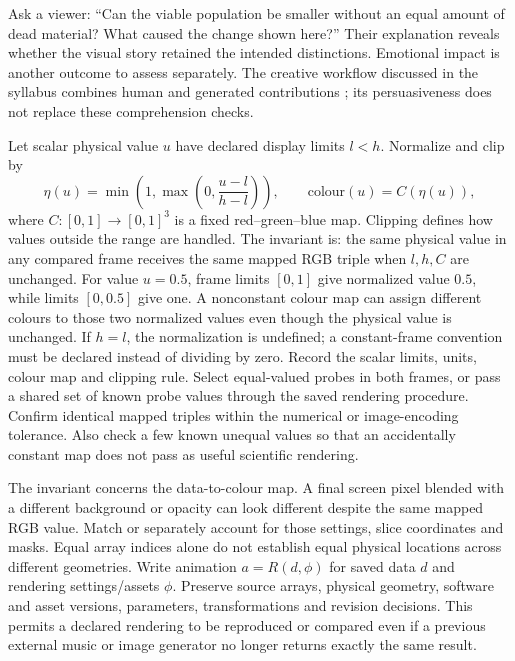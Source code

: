 Ask a viewer: ``Can the viable population be smaller without an equal amount of dead material? What caused the change shown here?'' Their explanation reveals whether the visual story retained the intended distinctions. Emotional impact is another outcome to assess separately. The creative workflow discussed in the syllabus combines human and generated contributions \citep{knudsen2026changed}; its persuasiveness does not replace these comprehension checks.

Let scalar physical value $u$ have declared display limits $l<h$. Normalize and clip by
\[
\eta(u)=\min\!\left(1,\max\!\left(0,\frac{u-l}{h-l}\right)\right),
\qquad \mathrm{colour}(u)=C(\eta(u)),
\]
where $C:[0,1]\to[0,1]^3$ is a fixed red--green--blue map. Clipping defines how values outside the range are handled. The invariant is: the same physical value in any compared frame receives the same mapped RGB triple when $l,h,C$ are unchanged.
For value $u=0.5$, frame limits $[0,1]$ give normalized value $0.5$, while limits $[0,0.5]$ give one. A nonconstant colour map can assign different colours to those two normalized values even though the physical value is unchanged. If $h=l$, the normalization is undefined; a constant-frame convention must be declared instead of dividing by zero.
Record the scalar limits, units, colour map and clipping rule. Select equal-valued probes in both frames, or pass a shared set of known probe values through the saved rendering procedure. Confirm identical mapped triples within the numerical or image-encoding tolerance. Also check a few known unequal values so that an accidentally constant map does not pass as useful scientific rendering.

The invariant concerns the data-to-colour map. A final screen pixel blended with a different background or opacity can look different despite the same mapped RGB value. Match or separately account for those settings, slice coordinates and masks. Equal array indices alone do not establish equal physical locations across different geometries.
Write animation $a=R(d,\phi)$ for saved data $d$ and rendering settings/assets $\phi$. Preserve source arrays, physical geometry, software and asset versions, parameters, transformations and revision decisions. This permits a declared rendering to be reproduced or compared even if a previous external music or image generator no longer returns exactly the same result.

